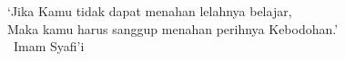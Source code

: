 \begin{dedication}
`Jika Kamu tidak dapat menahan lelahnya belajar, \\
Maka kamu harus sanggup menahan perihnya Kebodohan.'\\ 
~Imam Syafi'i~\\
\end{dedication}